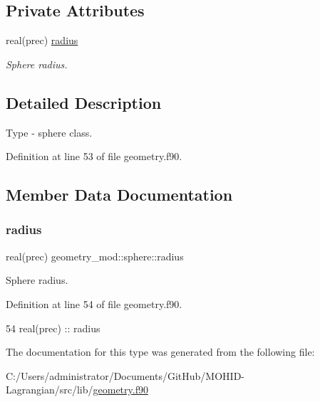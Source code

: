\subsection*{Private Attributes}
\begin{DoxyCompactItemize}
\item 
real(prec) \mbox{\hyperlink{structgeometry__mod_1_1sphere_aea9381f351c3670047fb7a779ef44fd7}{radius}}
\begin{DoxyCompactList}\small\item\em Sphere radius. \end{DoxyCompactList}\end{DoxyCompactItemize}


\subsection{Detailed Description}
Type -\/ sphere class. 

Definition at line 53 of file geometry.\+f90.



\subsection{Member Data Documentation}
\mbox{\label{structgeometry__mod_1_1sphere_aea9381f351c3670047fb7a779ef44fd7}} 
\subsubsection{\texorpdfstring{radius}{radius}}
{\footnotesize\ttfamily real(prec) geometry\+\_\+mod\+::sphere\+::radius\hspace{0.3cm}{\ttfamily [private]}}



Sphere radius. 



Definition at line 54 of file geometry.\+f90.


\begin{DoxyCode}
54         \textcolor{keywordtype}{real(prec)} :: radius
\end{DoxyCode}


The documentation for this type was generated from the following file\+:\begin{DoxyCompactItemize}
\item 
C\+:/\+Users/administrator/\+Documents/\+Git\+Hub/\+M\+O\+H\+I\+D-\/\+Lagrangian/src/lib/\mbox{\hyperlink{geometry_8f90}{geometry.\+f90}}\end{DoxyCompactItemize}
